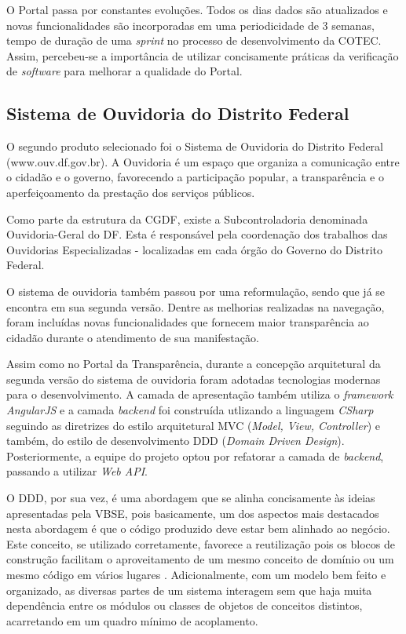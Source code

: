 O Portal passa por constantes evoluções. Todos os dias dados são atualizados e novas funcionalidades são incorporadas em uma periodicidade de 3 semanas, tempo de duração de uma \textit{sprint} no processo de desenvolvimento da COTEC. Assim, percebeu-se a importância de utilizar concisamente práticas da verificação de \textit{software} para melhorar a qualidade do Portal.

\subsection{Sistema de Ouvidoria do Distrito Federal}

O segundo produto selecionado foi o Sistema de Ouvidoria do Distrito Federal (www.ouv.df.gov.br). A Ouvidoria é um espaço que organiza a comunicação entre o cidadão e o governo, favorecendo a participação popular, a transparência e o aperfeiçoamento da prestação dos serviços públicos.

Como parte da estrutura da CGDF, existe a Subcontroladoria denominada Ouvidoria-Geral do DF. Esta é responsável pela coordenação dos trabalhos das Ouvidorias Especializadas - localizadas em cada órgão do Governo do Distrito Federal.

O sistema de ouvidoria também passou por uma reformulação, sendo que já se encontra em sua segunda versão. Dentre as melhorias realizadas na navegação, foram incluídas novas funcionalidades que fornecem maior transparência ao cidadão durante o atendimento de sua manifestação.

Assim como no Portal da Transparência, durante a concepção arquitetural da segunda versão do sistema de ouvidoria foram adotadas tecnologias modernas para o desenvolvimento. A camada de apresentação também utiliza o \textit{framework AngularJS} e a camada \textit{backend} foi construída utlizando a linguagem \textit{CSharp} seguindo as diretrizes do estilo arquitetural MVC (\textit{Model, View, Controller}) e também, do estilo de desenvolvimento DDD (\textit{Domain Driven Design}). Posteriormente, a equipe do projeto optou por refatorar a camada de \textit{backend}, passando a utilizar \textit{Web API}.

O DDD, por sua vez, é uma abordagem que se alinha concisamente às ideias apresentadas pela VBSE, pois basicamente, um dos aspectos mais destacados nesta abordagem é que o código produzido deve estar bem alinhado ao negócio. Este conceito, se utilizado corretamente, favorece a reutilização pois os blocos de construção facilitam o aproveitamento de um mesmo conceito de domínio ou um mesmo código em vários lugares \cite{ddd}. Adicionalmente, com um modelo bem feito e organizado, as diversas partes de um sistema interagem sem que haja muita dependência entre os módulos ou classes de objetos de conceitos distintos, acarretando em um quadro mínimo de acoplamento.

